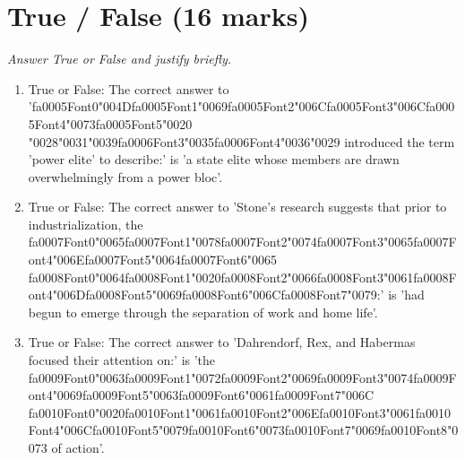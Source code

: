\documentclass[12pt]{article}
\begin{document}
\section*{True / False (16 marks)}
\textit{Answer True or False and justify briefly.}
\begin{enumerate}[label=\arabic*.]
\item True or False: The correct answer to '{\csname fa0005Font0\endcsname\char"004D}{\csname fa0005Font1\endcsname\char"0069}{\csname fa0005Font2\endcsname\char"006C}{\csname fa0005Font3\endcsname\char"006C}{\csname fa0005Font4\endcsname\char"0073}{\csname fa0005Font5\endcsname\char"0020} {\char"0028}{\char"0031}{\char"0039}{\csname fa0006Font3\endcsname\char"0035}{\csname fa0006Font4\endcsname\char"0036}{\char"0029} introduced the term 'power elite' to describe:' is 'a state elite whose members are drawn overwhelmingly from a power bloc'.
\item True or False: The correct answer to 'Stone's research suggests that prior to industrialization, the {\csname fa0007Font0\endcsname\char"0065}{\csname fa0007Font1\endcsname\char"0078}{\csname fa0007Font2\endcsname\char"0074}{\csname fa0007Font3\endcsname\char"0065}{\csname fa0007Font4\endcsname\char"006E}{\csname fa0007Font5\endcsname\char"0064}{\csname fa0007Font6\endcsname\char"0065} {\csname fa0008Font0\endcsname\char"0064}{\csname fa0008Font1\endcsname\char"0020}{\csname fa0008Font2\endcsname\char"0066}{\csname fa0008Font3\endcsname\char"0061}{\csname fa0008Font4\endcsname\char"006D}{\csname fa0008Font5\endcsname\char"0069}{\csname fa0008Font6\endcsname\char"006C}{\csname fa0008Font7\endcsname\char"0079}:' is 'had begun to emerge through the separation of work and home life'.
\item True or False: The correct answer to 'Dahrendorf, Rex, and Habermas focused their attention on:' is 'the {\csname fa0009Font0\endcsname\char"0063}{\csname fa0009Font1\endcsname\char"0072}{\csname fa0009Font2\endcsname\char"0069}{\csname fa0009Font3\endcsname\char"0074}{\csname fa0009Font4\endcsname\char"0069}{\csname fa0009Font5\endcsname\char"0063}{\csname fa0009Font6\endcsname\char"0061}{\csname fa0009Font7\endcsname\char"006C} {\csname fa0010Font0\endcsname\char"0020}{\csname fa0010Font1\endcsname\char"0061}{\csname fa0010Font2\endcsname\char"006E}{\csname fa0010Font3\endcsname\char"0061}{\csname fa0010Font4\endcsname\char"006C}{\csname fa0010Font5\endcsname\char"0079}{\csname fa0010Font6\endcsname\char"0073}{\csname fa0010Font7\endcsname\char"0069}{\csname fa0010Font8\endcsname\char"0073} of action'.

\end{enumerate}
\end{document}
